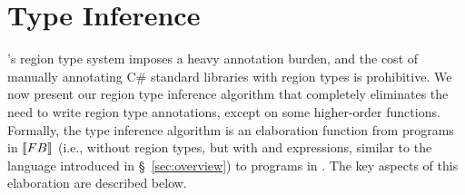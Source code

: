 \section{Type Inference}
\label{sec:type-inference}

\name's region type system imposes a heavy annotation burden, and the
cost of manually annotating C\# standard libraries with region types
is prohibitive. We now present our region type inference algorithm
that completely eliminates the need to write region type annotations,
except on some higher-order functions. Formally, the type inference
algorithm is an elaboration function from programs in $\llbracket {\sc FB} \rrbracket$
(i.e., \FB without region types, but with  and 
expressions, similar to the language introduced in
\S~\ref{sec:overview}) to programs in \FB. The key aspects of this
elaboration are described below.

%

